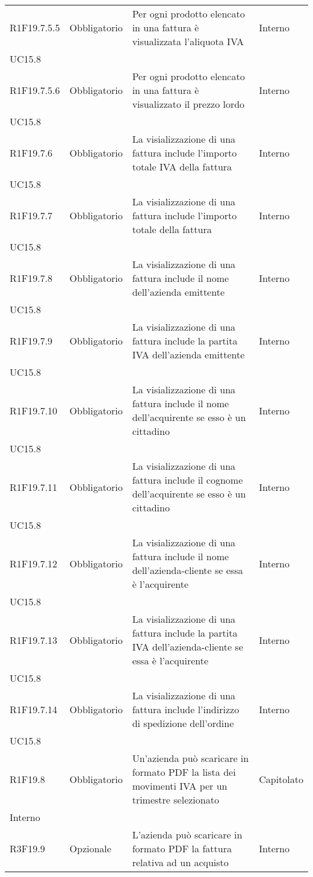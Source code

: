 \begin{longtable}{ >{\centering}p{} >{\centering}p{}
			>{\raggedright}p{} >{\centering}p{}}
R1F19.7.5.5	&	Obbligatorio	&	Per ogni prodotto elencato in una fattura è visualizzata l'aliquota IVA	&	Interno\\ UC15.8	\tabularnewline
R1F19.7.5.6	&	Obbligatorio	&	Per ogni prodotto elencato in una fattura è visualizzato il prezzo lordo\glo	&	Interno\\ UC15.8	\tabularnewline
R1F19.7.6	&	Obbligatorio	&	La visializzazione di una fattura include l'importo totale IVA della fattura	&	Interno\\ UC15.8	\tabularnewline
R1F19.7.7	&	Obbligatorio	&	La visializzazione di una fattura include l'importo totale della fattura	&	Interno\\ UC15.8	\tabularnewline
R1F19.7.8	&	Obbligatorio	&	La visializzazione di una fattura include il nome dell'azienda emittente	&	Interno\\ UC15.8	\tabularnewline
R1F19.7.9	&	Obbligatorio	&	La visializzazione di una fattura include la partita IVA dell'azienda emittente	&	Interno\\ UC15.8	\tabularnewline
R1F19.7.10	&	Obbligatorio	&	La visializzazione di una fattura include il nome dell'acquirente se esso è un cittadino	&	Interno\\ UC15.8	\tabularnewline
R1F19.7.11	&	Obbligatorio	&	La visializzazione di una fattura include il cognome dell'acquirente se esso è un cittadino	&	Interno\\ UC15.8	\tabularnewline
R1F19.7.12	&	Obbligatorio	&	La visializzazione di una fattura include il nome dell'azienda-cliente se essa è l'acquirente	&	Interno\\ UC15.8	\tabularnewline
R1F19.7.13	&	Obbligatorio	&	La visializzazione di una fattura include la partita IVA dell'azienda-cliente se essa è l'acquirente	&	Interno\\ UC15.8	\tabularnewline
R1F19.7.14	&	Obbligatorio	&	La visializzazione di una fattura include l'indirizzo di spedizione dell'ordine	&	Interno\\ UC15.8	\tabularnewline
R1F19.8	&	Obbligatorio	&	Un'azienda può scaricare in formato PDF la lista dei movimenti IVA per un trimestre selezionato	&	Capitolato\\ Interno	\tabularnewline
R3F19.9	&	Opzionale	&	L'azienda può scaricare in formato PDF la fattura relativa ad un acquisto	&	Interno	\tabularnewline
		
		
		
		
	\end{longtable}


